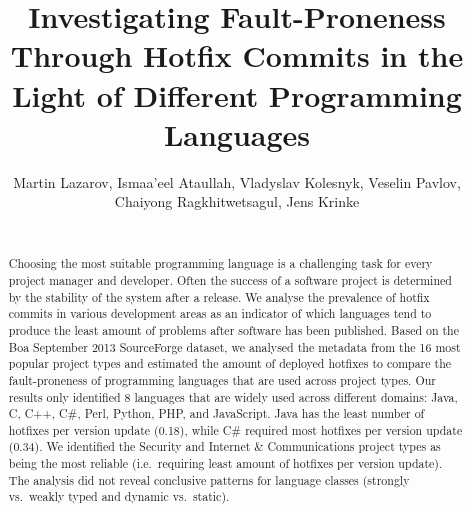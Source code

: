 \documentclass{sig-alternate}
\newcommand\FIXME[1]{\textbf{FIXME: #1}}
\begin{document}
\title{Investigating Fault-Proneness Through Hotfix Commits in the Light of Different Programming Languages}
\author{
  Martin Lazarov, Ismaa'eel Ataullah, Vladyslav Kolesnyk, Veselin Pavlov,\\ Chaiyong Ragkhitwetsagul, Jens Krinke\\
  \\
}

\maketitle

\begin{abstract}
Choosing the most suitable programming language is a challenging task for every project manager and developer. Often the success of a software project is determined by the stability of the system after a release. We analyse the prevalence of hotfix commits in various development areas as an indicator of which languages tend to produce the least amount of problems after software has been published. Based on the Boa September 2013 SourceForge dataset, we analysed the metadata from the 16 most popular project types and estimated the amount of deployed hotfixes to compare the fault-proneness of programming languages that are used across project types. Our results only identified 8 languages that are widely used across different domains: Java, C, C++, C\#, Perl, Python, PHP, and JavaScript. Java has the least number of hotfixes per version update (0.18), while C\# required most hotfixes per version update (0.34). We identified the Security and Internet \& Communications project types as being the most reliable (i.e.\ requiring least amount of hotfixes per version update). The analysis did not reveal conclusive patterns for language classes (strongly vs.\ weakly typed and dynamic vs.\ static).
\end{abstract}



\end{document}

